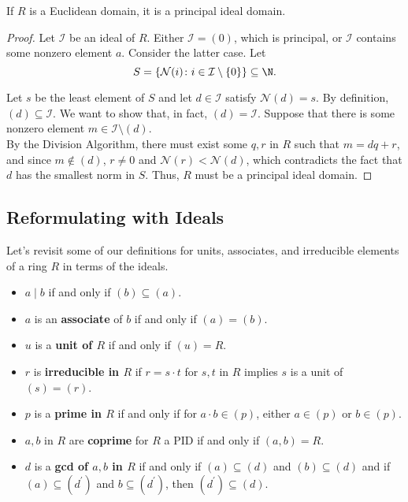 \documentclass[11pt]{article}
\begin{document}
\begin{theorem}
If $R$ is a Euclidean domain, it is a principal ideal domain.
\end{theorem}

\begin{proof}
Let $\mathcal{I} $ be an ideal of $R$. Either $\mathcal{I} = (0)$, which is principal, or $\mathcal{I} $ contains some nonzero element $a$.
Consider the latter case. Let 
\[
    S = \{ \mathcal{N}(i) \colon i \in \mathcal{I} \setminus \{ 0 \}  \} \subseteq \N.
\]

Let $s$ be the least element of $S$ and let $d \in \mathcal{I}$ satisfy $\mathcal{N} (d) = s$. By definition, $(d) \subseteq \mathcal{I}$. 
We want to show that, in fact, $(d) = \mathcal{I}$. Suppose that there is some nonzero element $m \in \mathcal{I} \setminus (d).$ \\

By the Division Algorithm, there must exist some $q, r$ in $R$ such that $m = dq + r$, and since $m \notin (d)$, $r \neq 0$ and $\mathcal{N} (r) < \mathcal{N} (d)$, which
contradicts the fact that $d$ has the smallest norm in $S$. Thus, $R$ must be a principal ideal domain.
\end{proof}

\subsection{Reformulating with Ideals}
Let's revisit some of our definitions for units, associates, and irreducible elements of a ring $R$ in terms of the ideals.

\begin{definition}
    \hfill
    \vspace{-0.25cm}
    \begin{itemize}
        \item $a \mid b$ if and only if $(b) \subseteq (a)$.
        \item $a$ is an \textbf{associate} of $b$ if and only if $(a) = (b)$.
        \item $u$ is a \textbf{unit of $R$} if and only if $(u) = R$.
        \item $r$ is \textbf{irreducible in $R$} if $r = s \cdot t$ for $s, t$ in $R$ implies $s$ is a unit of $(s) = (r)$.
        \item $p$ is a \textbf{prime in $R$} if and only if for $a \cdot b \in (p)$, either $a \in (p)$ or $b \in (p)$.
        \item $a, b$ in $R$ are \textbf{coprime} for $R$ a PID if and only if $(a, b) = R$.
        \item $d$ is a \textbf{gcd of $a, b$ in $R$} if and only if $(a) \subseteq  (d)$ and $(b) \subseteq (d)$ and 
        if $(a) \subseteq (d^{\prime})$ and $b \subseteq (d^{\prime})$, then $(d^{\prime}) \subseteq (d)$.
    \end{itemize}
\end{definition}
\end{document}
